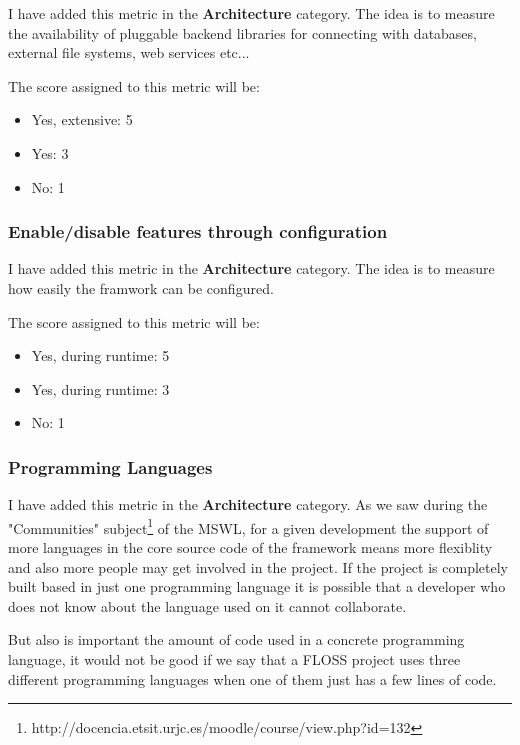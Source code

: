 \documentclass[a4paper,12pt]{book}
\begin{document}
I have added this metric in the \textbf{Architecture} category. The idea is to measure the availability of pluggable backend libraries for connecting with databases, external file systems, web services etc...

The score assigned to this metric will be:
\begin{itemize}
 \item Yes, extensive: 5
 \item Yes: 3
 \item No: 1
\end{itemize}

\subsubsection{Enable/disable features through configuration}
\label{Enable/disable features through configuration}

I have added this metric in the \textbf{Architecture} category. The idea is to measure how easily the framwork can be configured.

The score assigned to this metric will be:
\begin{itemize}
 \item Yes, during runtime: 5
 \item Yes, during runtime: 3
 \item No: 1
\end{itemize}

\subsubsection{Programming Languages}
\label{Programming Languages}

I have added this metric in the \textbf{Architecture} category. As we saw during the "Communities" subject\footnote{http://docencia.etsit.urjc.es/moodle/course/view.php?id=132}  of the MSWL, for a given development the support of more languages in the core source code of the framework means more flexiblity and also more people may get involved in the project. If the project is completely built based in just one programming language it is possible that a developer who does not know about the language used on it cannot collaborate.

But also is important the amount of code used in a concrete programming language, it would not be good if we say that a FLOSS project uses three different programming languages when one of them just has a few lines of code.
\end{document}

